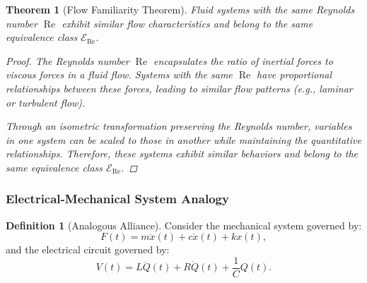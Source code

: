 \documentclass{article}
\newtheorem{theorem}{Theorem}[section]
\theoremstyle{definition}
\newtheorem{definition}{Definition}[section]
\theoremstyle{remark}
\begin{document}
	\begin{theorem}[Flow Familiarity Theorem]
		Fluid systems with the same Reynolds number $\operatorname{Re}$ exhibit similar flow characteristics and belong to the same equivalence class $\mathcal{E}_{\operatorname{Re}}$.
		
		\begin{proof}
			The Reynolds number $\operatorname{Re}$ encapsulates the ratio of inertial forces to viscous forces in a fluid flow. Systems with the same $\operatorname{Re}$ have proportional relationships between these forces, leading to similar flow patterns (e.g., laminar or turbulent flow).
			
			Through an isometric transformation preserving the Reynolds number, variables in one system can be scaled to those in another while maintaining the quantitative relationships. Therefore, these systems exhibit similar behaviors and belong to the same equivalence class $\mathcal{E}_{\operatorname{Re}}$.
		\end{proof}
	\end{theorem}
	
	\subsubsection{Electrical-Mechanical System Analogy}
	
	\begin{definition}[Analogous Alliance]
		Consider the mechanical system governed by:
		\[
		F(t) = m \ddot{x}(t) + c \dot{x}(t) + k x(t),
		\]
		and the electrical circuit governed by:
		\[
		V(t) = L \ddot{Q}(t) + R \dot{Q}(t) + \dfrac{1}{C} Q(t).
		\]
	\end{definition}
	
\end{document}
